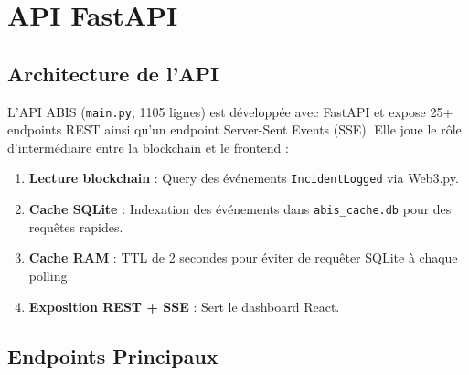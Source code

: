 \documentclass[12pt,a4paper]{report}
\newcommand{\code}[1]{\texttt{#1}}
\begin{document}
\section{API FastAPI}

\subsection{Architecture de l'API}

L'API ABIS (\code{main.py}, 1105 lignes) est développée avec FastAPI et expose 25+ endpoints REST ainsi qu'un endpoint Server-Sent Events (SSE). Elle joue le rôle d'intermédiaire entre la blockchain et le frontend :

\begin{enumerate}
  \item \textbf{Lecture blockchain} : Query des événements \code{IncidentLogged} via Web3.py.
  \item \textbf{Cache SQLite} : Indexation des événements dans \code{abis\_cache.db} pour des requêtes rapides.
  \item \textbf{Cache RAM} : TTL de 2 secondes pour éviter de requêter SQLite à chaque polling.
  \item \textbf{Exposition REST + SSE} : Sert le dashboard React.
\end{enumerate}

\subsection{Endpoints Principaux}
\end{document}
